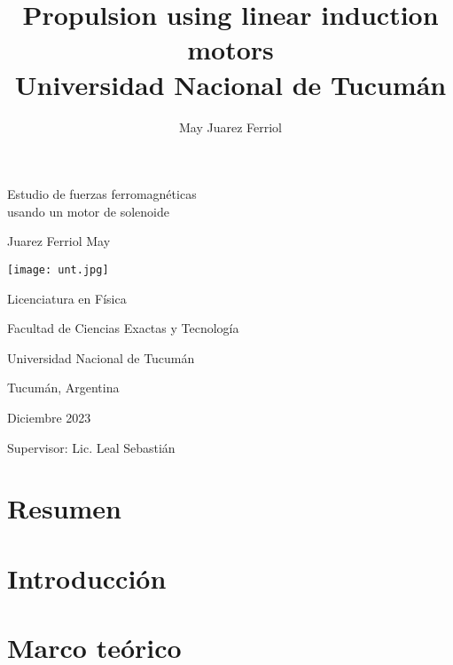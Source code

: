 \documentclass[a4paper,12pt]{article}
\title{Propulsion using linear induction motors\\ 
\medskip \large Universidad Nacional de Tucumán}
\author{May Juarez Ferriol}
\date{}
\begin{document}
\begin{titlepage}

    \begin{center}

        \vspace*{2cm}

        \Huge
        Estudio de fuerzas ferromagnéticas \\
        usando un motor de solenoide

        \vspace{1cm}

        \LARGE
        Juarez Ferriol May

        \vspace{1cm}

        \texttt{[image: unt.jpg]}

        \vspace{1cm}

        \Large
        Licenciatura en Física

        Facultad de Ciencias Exactas y Tecnología

        Universidad Nacional de Tucumán

        Tucumán, Argentina

        \vspace{1cm}

        Diciembre 2023

        \vspace{1cm}

        Supervisor: Lic. Leal Sebastián

    \end{center}

\end{titlepage}

\section*{Resumen}

    

\section*{Introducción}

    

\section*{Marco teórico}
\end{document}
